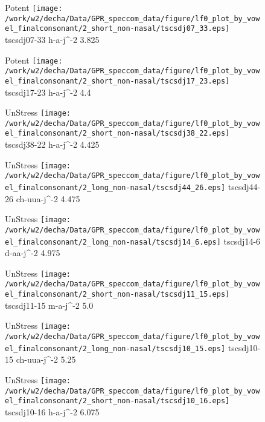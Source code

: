 \documentclass{article}
\begin{document}
\begin{figure}[t]
\begin{minipage}[b]{.24\textwidth}
\colorbox{Apricot}{Potent}
\centering
\texttt{[image: /work/w2/decha/Data/GPR\_speccom\_data/figure/lf0\_plot\_by\_vowel\_finalconsonant/2\_short\_non-nasal/tscsdj07\_33.eps]}
tscsdj07-33 h-a-j\textasciicircum-2 3.825
\end{minipage}
\begin{minipage}[b]{.24\textwidth}
\colorbox{Apricot}{Potent}
\centering
\texttt{[image: /work/w2/decha/Data/GPR\_speccom\_data/figure/lf0\_plot\_by\_vowel\_finalconsonant/2\_short\_non-nasal/tscsdj17\_23.eps]}
tscsdj17-23 h-a-j\textasciicircum-2 4.4
\end{minipage}
\begin{minipage}[b]{.24\textwidth}
UnStress
\centering
\texttt{[image: /work/w2/decha/Data/GPR\_speccom\_data/figure/lf0\_plot\_by\_vowel\_finalconsonant/2\_short\_non-nasal/tscsdj38\_22.eps]}
tscsdj38-22 h-a-j\textasciicircum-2 4.425
\end{minipage}
\begin{minipage}[b]{.24\textwidth}
UnStress
\centering
\texttt{[image: /work/w2/decha/Data/GPR\_speccom\_data/figure/lf0\_plot\_by\_vowel\_finalconsonant/2\_long\_non-nasal/tscsdj44\_26.eps]}
tscsdj44-26 ch-uua-j\textasciicircum-2 4.475
\end{minipage}
\end{figure}

\begin{figure}[t]
\begin{minipage}[b]{.24\textwidth}
UnStress
\centering
\texttt{[image: /work/w2/decha/Data/GPR\_speccom\_data/figure/lf0\_plot\_by\_vowel\_finalconsonant/2\_long\_non-nasal/tscsdj14\_6.eps]}
tscsdj14-6 d-aa-j\textasciicircum-2 4.975
\end{minipage}
\begin{minipage}[b]{.24\textwidth}
UnStress
\centering
\texttt{[image: /work/w2/decha/Data/GPR\_speccom\_data/figure/lf0\_plot\_by\_vowel\_finalconsonant/2\_short\_non-nasal/tscsdj11\_15.eps]}
tscsdj11-15 m-a-j\textasciicircum-2 5.0
\end{minipage}
\begin{minipage}[b]{.24\textwidth}
UnStress
\centering
\texttt{[image: /work/w2/decha/Data/GPR\_speccom\_data/figure/lf0\_plot\_by\_vowel\_finalconsonant/2\_long\_non-nasal/tscsdj10\_15.eps]}
tscsdj10-15 ch-uua-j\textasciicircum-2 5.25
\end{minipage}
\begin{minipage}[b]{.24\textwidth}
UnStress
\centering
\texttt{[image: /work/w2/decha/Data/GPR\_speccom\_data/figure/lf0\_plot\_by\_vowel\_finalconsonant/2\_short\_non-nasal/tscsdj10\_16.eps]}
tscsdj10-16 h-a-j\textasciicircum-2 6.075
\end{minipage}
\end{figure}
\end{document}

